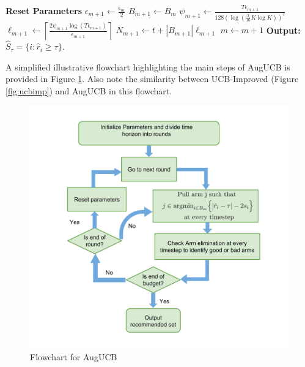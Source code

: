 \begin{algorithm}[t!]
\begin{algorithmic}
\vspace{-2mm}
\State {}
\State \textbf{Reset Parameters}
\State $\epsilon_{m+1}\leftarrow\frac{\epsilon_{m}}{2}$
\State $B_{m+1} \leftarrow B_{m}$
\State $\psi_{m+1}\leftarrow \frac{T\epsilon_{m+1}}{128(\log(\frac{3}{16}K\log K))^{2}}$
\State $\ell_{m+1}\leftarrow\left\lceil \frac{2\psi_{m+1}\log( T\epsilon_{m+1})}{\epsilon_{m+1}} \right\rceil$
\State $N_{m+1} \leftarrow t + |B_{m+1}|\ell_{m+1}$
\State $m \leftarrow m+1$
\EndIf
\EndFor
\State \textbf{Output:} $\hat{S}_{\tau}=\lbrace i: \hat{r}_{i}\geq \tau \rbrace$.
\end{algorithmic}
\end{algorithm}

A simplified illustrative flowchart highlighting the main steps of AugUCB is provided in Figure \ref{fig:augucb}. Also note the similarity between UCB-Improved (Figure \ref{fig:ucbimp}) and AugUCB in this flowchart.

\begin{figure}[!th]
\includegraphics[scale=0.45]{Chapter5/img/AugUCB_flow.png}
\caption{Flowchart for AugUCB}
\label{fig:augucb}
\end{figure}


